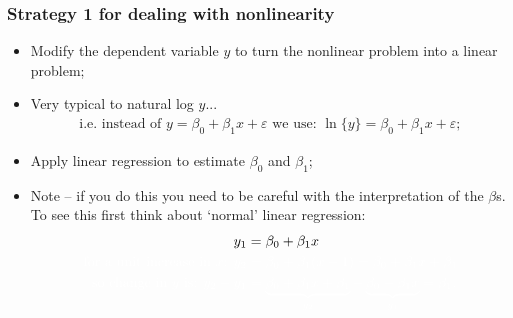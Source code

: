 \documentclass[aspectratio=169]{beamer}
\theoremstyle{principle}
\begin{document}
\begin{frame}
\frametitle{Strategy 1 for dealing with nonlinearity}

\begin{itemize}
\item Modify the dependent variable $y$ to turn the nonlinear problem into a linear problem;
\item Very typical to natural log $y$...
\begin{align*}
\mbox{i.e. instead of }y = \beta_0 + \beta_1x + \varepsilon\mbox{ we use: }\ln\{y\} = \beta_0 + \beta_1x + \varepsilon;
\end{align*}
\item Apply linear regression to estimate $\beta_0$ and $\beta_1$;
\item Note -- if you do this you need to be careful with the interpretation of the $\beta$s.  To see this first think about `normal' linear regression:
\begin{align*}
y_1 &= \beta_0 + \beta_1x\\
\color{white}\mbox{for a unit increase in $x$: } y_2 &\color{white}= \beta_0 + \beta_1(x + 1) = \beta_0 + \beta_1x + \beta_1\\
\color{white}\mbox{so change in $y$ is: }y_2 - y_1 &\color{white}= \underbrace{\beta_0 + \beta_1x + \beta_1}_{y_2} - \underbrace{\beta_0 - \beta_1x}_{y_1} = \beta_1.
\end{align*}

\end{itemize}

\end{frame}
\end{document}
